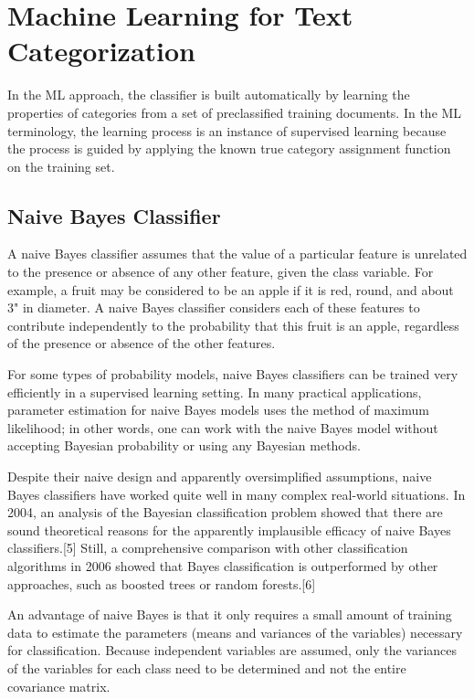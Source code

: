 \documentclass[12pt]{book}
\begin{document}
\section{Machine Learning for Text Categorization}

In the ML approach, the classifier is built automatically by learning the properties of categories from a set of preclassified training documents. In the ML terminology, the learning process is an instance of supervised learning because the process is guided by applying the known true category assignment function on the training set.

\subsection{Naive Bayes Classifier\cite{wikipedia-naive}}

A naive Bayes classifier assumes that the value of a particular feature is unrelated to the presence or absence of any other feature, given the class variable. For example, a fruit may be considered to be an apple if it is red, round, and about 3" in diameter. A naive Bayes classifier considers each of these features to contribute independently to the probability that this fruit is an apple, regardless of the presence or absence of the other features.

For some types of probability models, naive Bayes classifiers can be trained very efficiently in a supervised learning setting. In many practical applications, parameter estimation for naive Bayes models uses the method of maximum likelihood; in other words, one can work with the naive Bayes model without accepting Bayesian probability or using any Bayesian methods.

Despite their naive design and apparently oversimplified assumptions, naive Bayes classifiers have worked quite well in many complex real-world situations. In 2004, an analysis of the Bayesian classification problem showed that there are sound theoretical reasons for the apparently implausible efficacy of naive Bayes classifiers.[5] Still, a comprehensive comparison with other classification algorithms in 2006 showed that Bayes classification is outperformed by other approaches, such as boosted trees or random forests.[6]

An advantage of naive Bayes is that it only requires a small amount of training data to estimate the parameters (means and variances of the variables) necessary for classification. Because independent variables are assumed, only the variances of the variables for each class need to be determined and not the entire covariance matrix.
\end{document}
